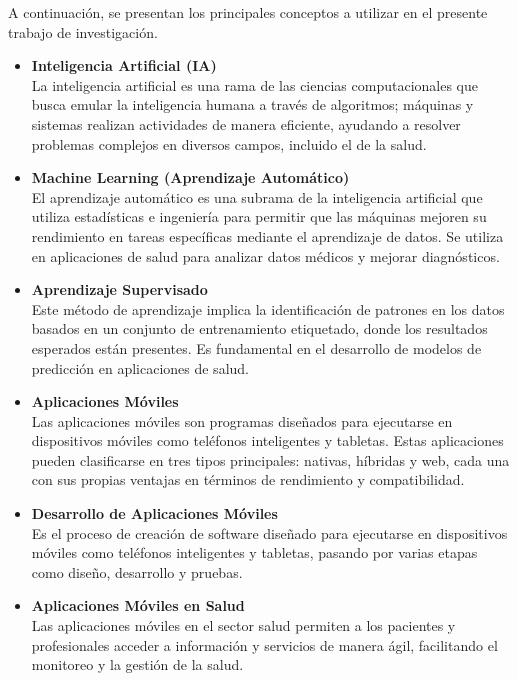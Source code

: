 A continuación, se presentan los principales conceptos a utilizar en el presente trabajo de 
investigación.

\begin{itemize}
    \item \textbf{Inteligencia Artificial (IA)} \\
    La inteligencia artificial es una rama de las ciencias computacionales que busca emular la inteligencia humana a través de algoritmos; máquinas y sistemas realizan actividades de manera eficiente, ayudando a resolver problemas complejos en diversos campos, incluido el de la salud. \parencite{russell2004}

    \item \textbf{Machine Learning (Aprendizaje Automático)} \\
    El aprendizaje automático es una subrama de la inteligencia artificial que utiliza estadísticas e ingeniería para permitir que las máquinas mejoren su rendimiento en tareas específicas mediante el aprendizaje de datos. Se utiliza en aplicaciones de salud para analizar datos médicos y mejorar diagnósticos. \parencite{harrington2012}

    \item \textbf{Aprendizaje Supervisado} \\
    Este método de aprendizaje implica la identificación de patrones en los datos basados en un conjunto de entrenamiento etiquetado, donde los resultados esperados están presentes. Es fundamental en el desarrollo de modelos de predicción en aplicaciones de salud. \parencite{harrington2012}
    
    \item \textbf{Aplicaciones Móviles} \\
    Las aplicaciones móviles son programas diseñados para ejecutarse en dispositivos móviles como teléfonos inteligentes y tabletas. Estas aplicaciones pueden clasificarse en tres tipos principales: nativas, híbridas y web, cada una con sus propias ventajas en términos de rendimiento y compatibilidad. \parencite{herazo2023}

    \item \textbf{Desarrollo de Aplicaciones Móviles} \\
    Es el proceso de creación de software diseñado para ejecutarse en dispositivos móviles como teléfonos inteligentes y tabletas, pasando por varias etapas como diseño, desarrollo y pruebas. \parencite{mathew2023}

    \item \textbf{Aplicaciones Móviles en Salud} \\
    Las aplicaciones móviles en el sector salud permiten a los pacientes y profesionales acceder a información y servicios de manera ágil, facilitando el monitoreo y la gestión de la salud. \parencite{reanima2023}


\end{itemize}
